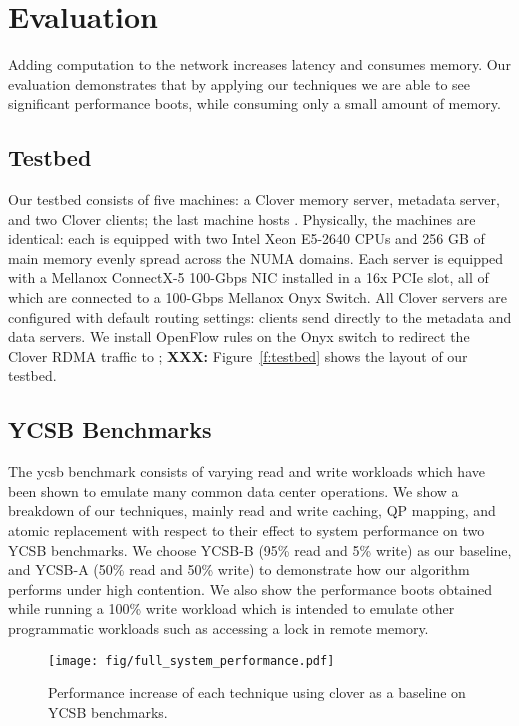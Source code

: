 \section{Evaluation}
\label{s:results}

Adding computation to the network increases latency and consumes memory. Our
evaluation demonstrates that by applying our techniques we are able to see
significant performance boots, while consuming only a small amount of memory.

\subsection{Testbed}


Our testbed consists of five machines: a Clover memory server,
metadata server, and two Clover clients; the last machine hosts
{\sword}. Physically, the machines are identical: each is equipped
with two Intel Xeon E5-2640 CPUs and 256 GB of main memory evenly
spread across the NUMA domains. Each server is equipped with a
Mellanox ConnectX-5 100-Gbps NIC installed in a 16x PCIe slot, all of
which are connected to a 100-Gbps Mellanox Onyx Switch. All Clover
servers are configured with default routing settings: clients send
directly to the metadata and data servers. We install OpenFlow rules
on the Onyx switch to redirect the Clover RDMA traffic to \sword; \textbf{XXX:} Figure~\ref{f:testbed} shows the layout of our
testbed.

\subsection{YCSB Benchmarks}

The ycsb benchmark consists of varying read and write workloads which have been
shown to emulate many common data center operations. We show a breakdown of our
techniques, mainly read and write caching, QP mapping, and atomic replacement
with respect to their effect to system performance on two YCSB benchmarks. We
choose YCSB-B (95\% read and 5\% write) as our baseline, and YCSB-A (50\% read and
50\% write) to demonstrate how our algorithm performs under high contention. We
also show the performance boots obtained while running a 100\% write workload
which is intended to emulate other programmatic workloads such as accessing a
lock in remote memory.

\begin{figure*}
    \texttt{[image: fig/full\_system\_performance.pdf]}
    \caption{{Performance increase of each technique using clover as a baseline on YCSB benchmarks.}}
    \label{fig:full_system_performance}
\end{figure*}

